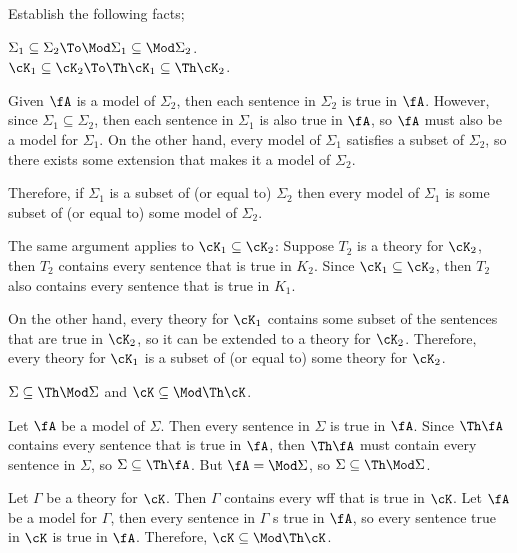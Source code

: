 \begin{problem}[3]
  Establish the following facts;
  \begin{enumalph}
    \item $\Sigma_1 \subseteq \Sigma_2 \To
      \Mod \Sigma_1 \subseteq \Mod \Sigma_2$.
      \\
      $\cK_1 \subseteq \cK_2 \To \Th \cK_1 \subseteq \Th \cK_2$.
      \begin{Answer}
        Given $\fA$ is a model of $\Sigma_2$, then each sentence in
        $\Sigma_2$ is true in $\fA$. However, since $\Sigma_1 \subseteq \Sigma_2$,
        then each sentence in $\Sigma_1$ is also true in $\fA$,
        so $\fA$ must also be a model for $\Sigma_1$.
        On the other hand, every model of $\Sigma_1$
        satisfies a subset of $\Sigma_2$, so there exists some extension
        that makes it a model of $\Sigma_2$.

        \step
        Therefore, if $\Sigma_1$ is a subset of (or equal to) $\Sigma_2$
        then every model of $\Sigma_1$ is some subset of (or equal to)
        some model of $\Sigma_2$.

        \bigskip
        \step
        The same argument applies to $\cK_1 \subseteq \cK_2$:
        Suppose $T_2$ is a theory for $\cK_2$, then $T_2$
        contains every sentence that is true in $K_2$.
        Since $\cK_1 \subseteq \cK_2$, then $T_2$ also contains
        every sentence that is true in $K_1$.
        
        \step
        On the other hand, every theory for $\cK_1$ contains some subset
        of the sentences that are true in $\cK_2$, so it can be extended
        to a theory for $\cK_2$.
        Therefore, every theory for $\cK_1$ is a subset of (or equal to)
        some theory for $\cK_2$.
      \end{Answer}
    \item $\Sigma \subseteq \Th \Mod \Sigma$ and $\cK \subseteq \Mod \Th \cK$.
    \begin{Answer}
      Let $\fA$ be a model of $\Sigma$.
      Then every sentence in $\Sigma$ is true in $\fA$.
      Since $\Th \fA$ contains every sentence that is true in $\fA$,
      then $\Th \fA$ must contain every sentence in $\Sigma$,
      so $\Sigma \subseteq \Th \fA$.
      But $\fA = \Mod \Sigma$, so $\Sigma \subseteq \Th \Mod \Sigma$.

      \bigskip
      \step
      Let $\Gamma$ be a theory for $\cK$.
      Then $\Gamma$ contains every wff that is true in $\cK$.
      Let $\fA$ be a model for $\Gamma$, then every sentence in $\Gamma$
      s true in $\fA$, so every sentence true in $\cK$ is true in $\fA$.
      Therefore, $\cK \subseteq \Mod \Th \cK$.


\end{Answer}
\end{enumalph}
\end{problem}
